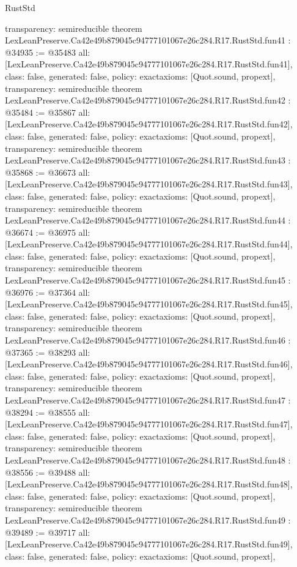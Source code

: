\begin{lexlean}{RustStd}
\begin{coremodule}
{  transparency: semireducible
}
theorem LexLeanPreserve.Ca42e49b879045c94777101067e26c284.R17.RustStd.fun41 : @34935 := @35483 {
  all: [LexLeanPreserve.Ca42e49b879045c94777101067e26c284.R17.RustStd.fun41],
  class: false,
  generated: false,
  policy: exact{axioms: [Quot.sound, propext]},
  transparency: semireducible
}
theorem LexLeanPreserve.Ca42e49b879045c94777101067e26c284.R17.RustStd.fun42 : @35484 := @35867 {
  all: [LexLeanPreserve.Ca42e49b879045c94777101067e26c284.R17.RustStd.fun42],
  class: false,
  generated: false,
  policy: exact{axioms: [Quot.sound, propext]},
  transparency: semireducible
}
theorem LexLeanPreserve.Ca42e49b879045c94777101067e26c284.R17.RustStd.fun43 : @35868 := @36673 {
  all: [LexLeanPreserve.Ca42e49b879045c94777101067e26c284.R17.RustStd.fun43],
  class: false,
  generated: false,
  policy: exact{axioms: [Quot.sound, propext]},
  transparency: semireducible
}
theorem LexLeanPreserve.Ca42e49b879045c94777101067e26c284.R17.RustStd.fun44 : @36674 := @36975 {
  all: [LexLeanPreserve.Ca42e49b879045c94777101067e26c284.R17.RustStd.fun44],
  class: false,
  generated: false,
  policy: exact{axioms: [Quot.sound, propext]},
  transparency: semireducible
}
theorem LexLeanPreserve.Ca42e49b879045c94777101067e26c284.R17.RustStd.fun45 : @36976 := @37364 {
  all: [LexLeanPreserve.Ca42e49b879045c94777101067e26c284.R17.RustStd.fun45],
  class: false,
  generated: false,
  policy: exact{axioms: [Quot.sound, propext]},
  transparency: semireducible
}
theorem LexLeanPreserve.Ca42e49b879045c94777101067e26c284.R17.RustStd.fun46 : @37365 := @38293 {
  all: [LexLeanPreserve.Ca42e49b879045c94777101067e26c284.R17.RustStd.fun46],
  class: false,
  generated: false,
  policy: exact{axioms: [Quot.sound, propext]},
  transparency: semireducible
}
theorem LexLeanPreserve.Ca42e49b879045c94777101067e26c284.R17.RustStd.fun47 : @38294 := @38555 {
  all: [LexLeanPreserve.Ca42e49b879045c94777101067e26c284.R17.RustStd.fun47],
  class: false,
  generated: false,
  policy: exact{axioms: [Quot.sound, propext]},
  transparency: semireducible
}
theorem LexLeanPreserve.Ca42e49b879045c94777101067e26c284.R17.RustStd.fun48 : @38556 := @39488 {
  all: [LexLeanPreserve.Ca42e49b879045c94777101067e26c284.R17.RustStd.fun48],
  class: false,
  generated: false,
  policy: exact{axioms: [Quot.sound, propext]},
  transparency: semireducible
}
theorem LexLeanPreserve.Ca42e49b879045c94777101067e26c284.R17.RustStd.fun49 : @39489 := @39717 {
  all: [LexLeanPreserve.Ca42e49b879045c94777101067e26c284.R17.RustStd.fun49],
  class: false,
  generated: false,
  policy: exact{axioms: [Quot.sound, propext]},
}
\end{coremodule}
\end{lexlean}
